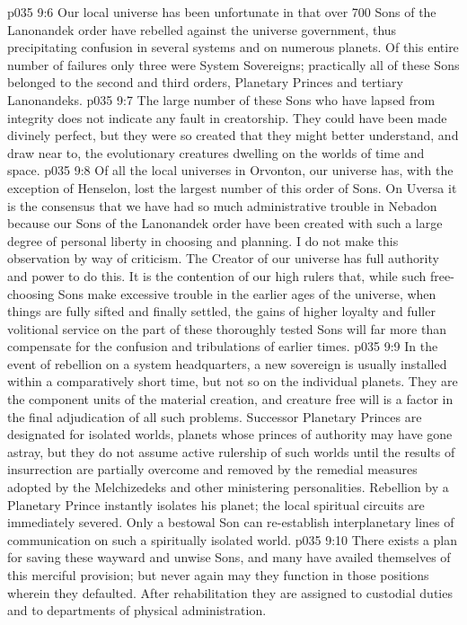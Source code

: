 \vs p035 9:6 Our local universe has been unfortunate in that over 700 Sons of the Lanonandek order have rebelled against the universe government, thus precipitating confusion in several systems and on numerous planets. Of this entire number of failures only three were System Sovereigns; practically all of these Sons belonged to the second and third orders, Planetary Princes and tertiary Lanonandeks.
\vs p035 9:7 The large number of these Sons who have lapsed from integrity does not indicate any fault in creatorship. They could have been made divinely perfect, but they were so created that they might better understand, and draw near to, the evolutionary creatures dwelling on the worlds of time and space.
\vs p035 9:8 Of all the local universes in Orvonton, our universe has, with the exception of Henselon, lost the largest number of this order of Sons. On Uversa it is the consensus that we have had so much administrative trouble in Nebadon because our Sons of the Lanonandek order have been created with such a large degree of personal liberty in choosing and planning. I do not make this observation by way of criticism. The Creator of our universe has full authority and power to do this. It is the contention of our high rulers that, while such free\hyp{}choosing Sons make excessive trouble in the earlier ages of the universe, when things are fully sifted and finally settled, the gains of higher loyalty and fuller volitional service on the part of these thoroughly tested Sons will far more than compensate for the confusion and tribulations of earlier times.
\vs p035 9:9 \pc In the event of rebellion on a system headquarters, a new sovereign is usually installed within a comparatively short time, but not so on the individual planets. They are the component units of the material creation, and creature free will is a factor in the final adjudication of all such problems. Successor Planetary Princes are designated for isolated worlds, planets whose princes of authority may have gone astray, but they do not assume active rulership of such worlds until the results of insurrection are partially overcome and removed by the remedial measures adopted by the Melchizedeks and other ministering personalities. Rebellion by a Planetary Prince instantly isolates his planet; the local spiritual circuits are immediately severed. Only a bestowal Son can re\hyp{}establish interplanetary lines of communication on such a spiritually isolated world.
\vs p035 9:10 There exists a plan for saving these wayward and unwise Sons, and many have availed themselves of this merciful provision; but never again may they function in those positions wherein they defaulted. After rehabilitation they are assigned to custodial duties and to departments of physical administration.
